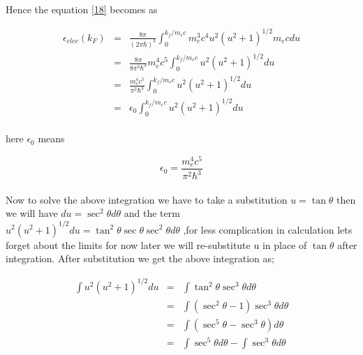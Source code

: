 \documentclass{report}
\begin{document}
\paragraph{ }
Hence the equation \ref{18} becomes as 
\begin{center}
\begin{eqnarray}
\epsilon_{elec}(k_F) &=& \frac{8\pi}{(2\pi \hbar)^3} \int_0 ^{k_f /m_e c}m_e ^3 c^4 u^2(u^2+1)^{1/2} m_e c du \nonumber \\
	&=& \frac{8\pi}{8\pi ^3 \hbar ^3}m_e ^4 c^5 \int_0 ^{k_f /m_e c}u^2 (u^2+1)^{1/2}du \nonumber \\
	&=& \frac{m_e^4 c^5}{\pi ^2 \hbar ^3} \int_0 ^{k_f /m_e c} u^2 (u^2+1)^{1/2}du \nonumber \\
	&=& \epsilon_0 \int_0 ^{k_f /m_e c} u^2 (u^2+1)^{1/2}du \nonumber 
\end{eqnarray}
\end{center}
\paragraph{ }
here $\epsilon_0$ means 
\begin{center}
\begin{equation}
\epsilon_0 = \frac{m_e ^4 c^5}{\pi ^2 \hbar ^3}
\label{19}
\end{equation}
\end{center}
\paragraph{ }
Now to solve the above integration we have to take a substitution $ u= \tan \theta$ then we will have $ du = \sec ^2 \theta d\theta$ and the term $u^2 (u^2+1)^{1/2}du = \tan ^2 \theta \sec \theta \sec ^2 \theta d\theta$
,for less complication in calculation lets forget about the limits for now later we will re-substitute u in place of $ \tan \theta $ after integration. After substitution we get the above integration as;
\begin{center}
\begin{eqnarray}
\int  u^2 (u^2+1)^{1/2}du &=& \int \tan^2 \theta \sec ^3 \theta d\theta \nonumber \\
	&=& \int (\sec ^2 \theta -1 )\sec ^3\theta d\theta \nonumber \\
	&=& \int (\sec^5 \theta  - \sec^3 \theta ) d\theta \nonumber \\
	&=& \int \sec^5 \theta d\theta - \int \sec^3 \theta d\theta \nonumber 
\end{eqnarray}
\end{center}
\end{document}
